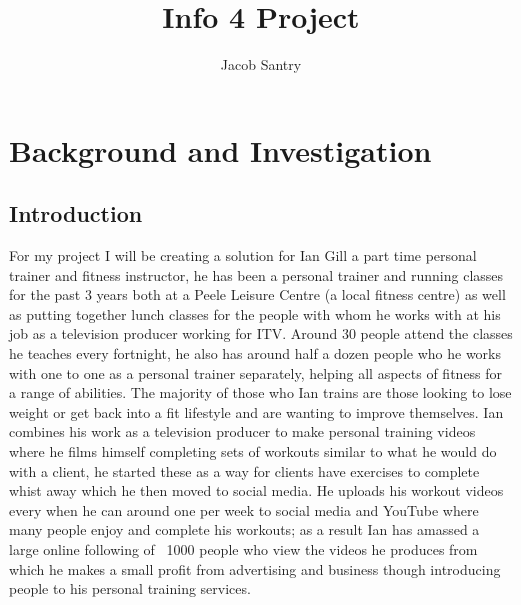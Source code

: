 \documentclass[a4paper]{article}
\title{Info 4 Project}
\author{Jacob Santry}
\begin{document}
\thispagestyle{empty}
\maketitle

\tableofcontents

\section{Background and Investigation}

	\subsection{Introduction}
	For my project I will be creating a solution for Ian Gill a part time personal trainer and fitness instructor, he has been a personal trainer and running classes for the past 3 years both at a Peele Leisure Centre (a local fitness centre) as well as putting together lunch classes for the people with whom he works with at his job as a television producer working for ITV. Around 30 people attend the classes he teaches every fortnight, he also has around half a dozen people who he works with one to one as a personal trainer separately, helping all aspects of fitness for a range of abilities. The majority of those who Ian trains are those looking to lose weight or get back into a fit lifestyle and are wanting to improve themselves. Ian combines his work as a television producer to make personal training videos where he films himself completing sets of workouts similar to what he would do with a client, he started these as a way for clients have exercises to complete whist away which he then moved to social media. He uploads his workout videos every when he can around one per week to social media and YouTube where many people enjoy and complete his workouts; as a result Ian has amassed a large online following of ~1000 people who view the videos he produces from which he makes a small profit from advertising and business though introducing people to his personal training services.
\end{document}
